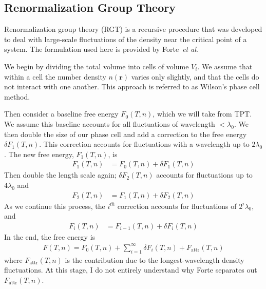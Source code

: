 \documentclass[letterpaper,twocolumn,amsmath,amssymb,prb]{revtex4-1}
\newcommand{\rr}{\ensuremath{\mathbf{r}}}
\newcommand{\Fattr}{\ensuremath{F_\text{attr}(T,n)}}
\begin{document}
\subsection{Renormalization Group Theory}\label{subsec:RGT}
Renormalization group theory (RGT) is a recursive procedure that was
developed to deal with large-scale fluctuations of the density
near the critical point of a system. The formulation used here is
provided by Forte~\textit{et al}.\cite{Forte11}

We begin by dividing the total volume into cells of volume $V_i$. We
assume that within a cell the number density $n(\rr)$ varies only slightly, and that the
cells do not interact with one another. This approach is referred to as Wilson's
phase cell method.\cite{Ramana12}

Then consider a baseline free energy $F_0(T,n)$, which we will take
from TPT. We assume this baseline accounts for all fluctuations of
wavelength $ < \lambda_0$. We then double the size of our phase cell
and add a correction to the free energy $\delta F_1(T,n)$. This
correction accounts for fluctuations with a wavelength up to
$2\lambda_0$. The new free energy, $F_1(T,n)$, is
\begin{align}
  F_1(T,n) &= F_0(T,n) + \delta F_1(T,n)
\end{align}
Then double the length scale again; $\delta F_2(T,n)$ accounts for
fluctuations up to $4\lambda_0$ and
\begin{align}
  F_2(T,n) &= F_1(T,n) + \delta F_2(T,n)
\end{align}
As we continue this process, the $i^{th}$ correction accounts for
fluctuations of $2^i\lambda_0$, and
\begin{align}
  F_i(T,n) &= F_{i-1}(T,n) + \delta F_i(T,n)
\end{align}
In the end, the free energy is
\begin{align}
  F(T,n) = F_0(T,n) + \sum_{i=1}^\infty\delta F_i(T,n) + \Fattr
\end{align}
where $\Fattr$ is the contribution due to the longest-wavelength
density fluctuations. At this stage, I do not entirely understand why
Forte separates out $\Fattr$.
\end{document}
